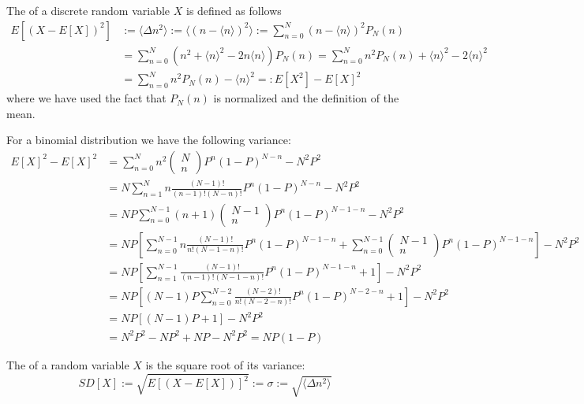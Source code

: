 \documentclass[12pt, a4paper, oneside, openright, titlepage]{book}
\begin{document}
\begin{defn}
    The  of a discrete random variable $X$ is defined as follows \begin{align*}
        E[(X-E[X])^2] &:= \langle \Delta n^2\rangle := \langle (n-\langle n\rangle)^2\rangle := \sum_{n=0}^N(n-\langle n \rangle)^2P_N(n) \\
        &= \sum_{n=0}^N(n^2+\langle n \rangle^2-2n\langle n \rangle)P_N(n) = \sum_{n=0}^Nn^2P_N(n) + \langle n\rangle^2 - 2\langle n\rangle^2 \\
        &= \sum_{n=0}^Nn^2P_N(n) - \langle n\rangle^2 =: E[X^2] - E[X]^2
    \end{align*}
    where we have used the fact that $P_N(n)$ is normalized and the definition of the mean.
\end{defn}

For a binomial distribution we have the following variance: 
\begin{align*}
    E[X]^2 - E[X]^2 &= \sum_{n=0}^Nn^2\begin{pmatrix} N \\ n\end{pmatrix} P^n(1-P)^{N-n} - N^2P^2 \\
    &= N\sum_{n=1}^Nn\frac{(N-1)!}{(n-1)!(N-n)!}P^n(1-P)^{N-n} - N^2P^2 \\
    &= NP\sum_{n=0}^{N-1}(n+1)\begin{pmatrix} N-1 \\ n\end{pmatrix} P^{n}(1-P)^{N-1-n} -N^2P^2 \\
    &= NP\left[\sum_{n=0}^{N-1}n\frac{(N-1)!}{n!(N-1-n)!}P^n(1-P)^{N-1-n} + \sum_{n=0}^{N-1}\begin{pmatrix} N-1 \\ n\end{pmatrix} P^{n}(1-P)^{N-1-n}\right] - N^2P^2 \\
    &= NP\left[\sum_{n=1}^{N-1}\frac{(N-1)!}{(n-1)!(N-1-n)!}P^n(1-P)^{N-1-n} + 1\right] - N^2P^2 \\
    &= NP\left[(N-1)P\sum_{n=0}^{N-2}\frac{(N-2)!}{n!(N-2-n)!}P^n(1-P)^{N-2-n}+1\right] - N^2P^2 \\
    &= NP\left[(N-1)P+1\right] -N^2P^2 \\
    &= N^2P^2 - NP^2+NP - N^2P^2 = NP(1-P)
\end{align*}

\begin{defn}
    The  of a random variable $X$ is the square root of its variance: \begin{equation*}
        SD[X] := \sqrt{E[(X-E[X])]^2} := \sigma := \sqrt{\langle \Delta n^2\rangle}
    \end{equation*}
\end{defn}
\end{document}
